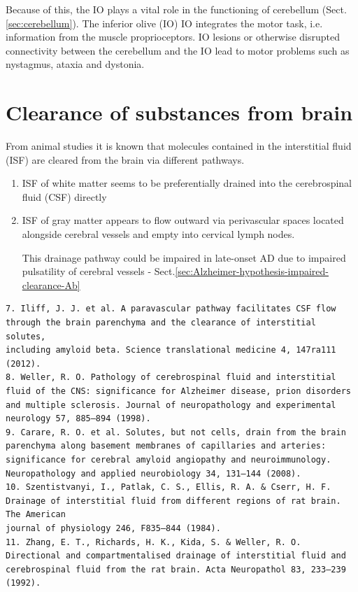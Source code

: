 Because of this, the IO plays a vital role in the functioning of cerebellum
(Sect.\ref{sec:cerebellum}). The inferior olive (IO) IO integrates the motor
task, i.e. information from the muscle proprioceptors. IO lesions or otherwise
disrupted connectivity between the cerebellum and the IO lead to motor problems
such as nystagmus, ataxia and dystonia.




\section{Clearance of substances from brain}
\label{sec:clearance-in-brain}

From animal studies it is known that molecules contained in the interstitial
fluid (ISF) are cleared from the brain via different pathways.

\begin{enumerate}
  \item  ISF of white matter seems to be preferentially drained into
the cerebrospinal fluid (CSF) directly

  \item ISF of gray matter appears to flow outward via perivascular
spaces located alongside cerebral vessels and empty into cervical lymph nodes.

This drainage pathway could be impaired in late-onset AD due to impaired
pulsatility of cerebral vessels - Sect.\ref{sec:Alzheimer-hypothesis-impaired-clearance-Ab}

\end{enumerate}


\begin{verbatim}
7. Iliff, J. J. et al. A paravascular pathway facilitates CSF flow through the brain parenchyma and the clearance of interstitial solutes,
including amyloid beta. Science translational medicine 4, 147ra111 (2012).
8. Weller, R. O. Pathology of cerebrospinal fluid and interstitial fluid of the CNS: significance for Alzheimer disease, prion disorders
and multiple sclerosis. Journal of neuropathology and experimental neurology 57, 885–894 (1998).
9. Carare, R. O. et al. Solutes, but not cells, drain from the brain parenchyma along basement membranes of capillaries and arteries:
significance for cerebral amyloid angiopathy and neuroimmunology. Neuropathology and applied neurobiology 34, 131–144 (2008).
10. Szentistvanyi, I., Patlak, C. S., Ellis, R. A. & Cserr, H. F. Drainage of interstitial fluid from different regions of rat brain. The American
journal of physiology 246, F835–844 (1984).
11. Zhang, E. T., Richards, H. K., Kida, S. & Weller, R. O. Directional and compartmentalised drainage of interstitial fluid and
cerebrospinal fluid from the rat brain. Acta Neuropathol 83, 233–239 (1992).
\end{verbatim}

